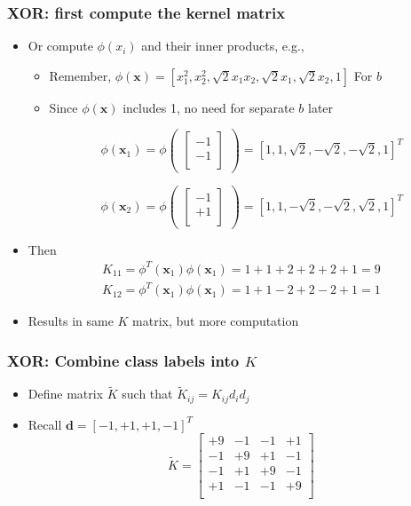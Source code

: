 \documentclass[12pt,notes,mathserif]{beamer}
\begin{document}
\begin{frame}[c]
\frametitle{XOR: first compute the kernel matrix}
\begin{itemize}
\item Or compute $\phi(x_i)$ and their inner products, e.g.,
\begin{itemize}
\item Remember, $\phi(\mathbf{x})=[x_1^2,x_2^2,\sqrt2x_1x_2,\sqrt2x_1,\sqrt2x_2,1]$ For $b$
\item Since $\phi (\mathbf{x})$ includes 1, no need for separate $b$ later

\[
\phi(\mathbf{x}_1)=\phi\begin{pmatrix}\begin{bmatrix}
-1\\
-1\\
\end{bmatrix}
\end{pmatrix}=
[1,1,\sqrt2,-\sqrt2,-\sqrt2,1]^T
\]

\[
\phi(\mathbf{x}_2)=\phi\begin{pmatrix}\begin{bmatrix}
-1\\
+1\\
\end{bmatrix}
\end{pmatrix}=
[1,1,-\sqrt2,-\sqrt2,\sqrt2,1]^T
\]
\end{itemize}
\item Then
\begin{gather*}
K_{11}=\phi^T(\mathbf{x}_1)\phi(\mathbf{x}_1)=1+1+2+2+2+1=9\\
K_{12}=\phi^T(\mathbf{x}_1)\phi(\mathbf{x}_1)=1+1-2+2-2+1=1
\end{gather*}
\item Results in same $K$ matrix, but more computation
\end{itemize}
\end{frame}




\begin{frame}[c]
\frametitle{XOR: Combine class labels into $K$}
\begin{itemize}
\item Define matrix $\tilde{K}$ such that $\tilde{K}_{ij}=K_{ij}d_id_j$
\item Recall $\mathbf{d}=[-1,+1,+1,-1]^T$
\[
\tilde{K}=
\begin{bmatrix}
+9&-1&-1&+1\\
-1&+9&+1&-1\\
-1&+1&+9&-1\\
+1&-1&-1&+9\\
\end{bmatrix}
\]
\end{itemize}
\end{frame}
\end{document}
